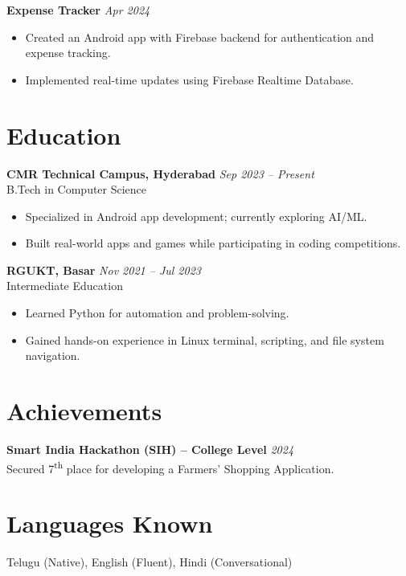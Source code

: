 \documentclass[a4paper,10pt]{article}
\begin{document}
\textbf{Expense Tracker} \hfill \textit{Apr 2024} \\
\begin{itemize}[leftmargin=*, itemsep=1pt]
    \item Created an Android app with Firebase backend for authentication and expense tracking.
    \item Implemented real-time updates using Firebase Realtime Database.
\end{itemize}



\section*{Education}

\textbf{CMR Technical Campus, Hyderabad} \hfill \textit{Sep 2023 – Present} \\
B.Tech in Computer Science \\
\begin{itemize}[leftmargin=*, itemsep=1pt]
    \item Specialized in Android app development; currently exploring AI/ML.
    \item Built real-world apps and games while participating in coding competitions.
\end{itemize}

\textbf{RGUKT, Basar} \hfill \textit{Nov 2021 – Jul 2023} \\
Intermediate Education \\
\begin{itemize}[leftmargin=*, itemsep=1pt]
    \item Learned Python for automation and problem-solving.
    \item Gained hands-on experience in Linux terminal, scripting, and file system navigation.
\end{itemize}



\section*{Achievements}

\textbf{Smart India Hackathon (SIH) – College Level} \hfill \textit{2024} \\
Secured 7\textsuperscript{th} place for developing a Farmers' Shopping Application.

\section*{Languages Known}

Telugu (Native), English (Fluent), Hindi (Conversational)
\end{document}
